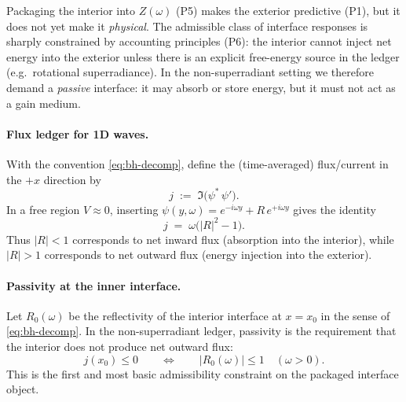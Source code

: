
Packaging the interior into $Z(\omega)$ (P5) makes the exterior predictive (P1), but it does not yet make it \emph{physical}. The admissible class of interface responses is sharply constrained by accounting principles (P6): the interior cannot inject net energy into the exterior unless there is an explicit free-energy source in the ledger (e.g.\ rotational superradiance). In the non-superradiant setting we therefore demand a \emph{passive} interface: it may absorb or store energy, but it must not act as a gain medium.

\paragraph{Flux ledger for 1D waves.}
With the convention \eqref{eq:bh-decomp}, define the (time-averaged) flux/current in the $+x$ direction by
\begin{equation}
  j \;:=\; \Im\!\big(\psi^*\,\psi'\big).
  \label{eq:bh-fluxdef}
\end{equation}
In a free region $V\approx 0$, inserting $\psi(y,\omega)=e^{-i\omega y}+R\,e^{+i\omega y}$ gives the identity
\begin{equation}
  j \;=\; \omega\big(|R|^2 - 1\big).
  \label{eq:bh-fluxR}
\end{equation}
Thus $|R|<1$ corresponds to net inward flux (absorption into the interior), while $|R|>1$ corresponds to net outward flux (energy injection into the exterior).

\paragraph{Passivity at the inner interface.}
Let $R_0(\omega)$ be the reflectivity of the interior interface at $x=x_0$ in the sense of \eqref{eq:bh-decomp}. In the non-superradiant ledger, passivity is the requirement that the interior does not produce net outward flux:
\begin{equation}
  j(x_0) \le 0
  \qquad\Longleftrightarrow\qquad
  |R_0(\omega)| \le 1
  \quad (\omega>0).
  \label{eq:bh-passiveR}
\end{equation}
This is the first and most basic admissibility constraint on the packaged interface object.

